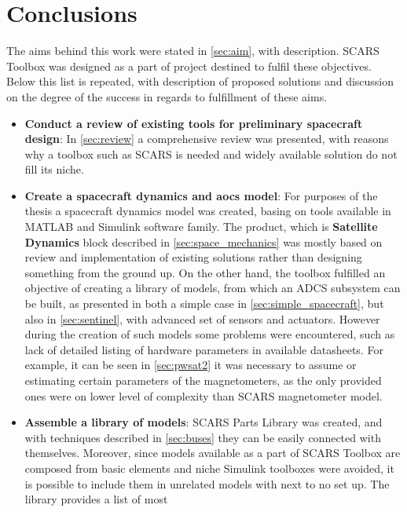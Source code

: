 \section{Conclusions}\label{sec:conclusions}

    The aims behind this work were stated in \autoref{sec:aim}, with description. SCARS Toolbox was designed as a part of project destined to fulfil these objectives. Below this list is repeated, with description of proposed solutions and discussion on the degree of the success in regards to fulfillment of these aims.
    
    \begin{itemize}
        \item \textbf{Conduct a review of existing tools for preliminary spacecraft design}: In \autoref{sec:review} a comprehensive review was presented, with reasons why a toolbox such as SCARS is needed and widely available solution do not fill its niche.
        \item \textbf{Create a spacecraft dynamics and \ac{aocs} model}: For purposes of the thesis a spacecraft dynamics model was created, basing on tools available in MATLAB  and Simulink software family. The product, which is \textbf{Satellite Dynamics} block described in \autoref{sec:space_mechanics} was mostly based on review and implementation of existing solutions rather than designing something from the ground up. On the other hand, the toolbox fulfilled an objective of creating a library of models, from which an ADCS subsystem can be built, as presented in both a simple case in \autoref{sec:simple_spacecraft}, but also in \autoref{sec:sentinel}, with advanced set of sensors and actuators. However during the creation of such models some problems were encountered, such as lack of detailed listing of hardware parameters in available datasheets. For example, it can be seen in \autoref{sec:pwsat2} it was necessary to assume or estimating certain parameters of the magnetometers, as the only provided ones were on lower level of complexity than SCARS magnetometer model.
        \item \textbf{Assemble a library of models}: SCARS Parts Library was created, and with techniques described in \autoref{sec:buses} they can be easily connected with themselves. Moreover, since models available as a part of SCARS Toolbox are composed from basic elements and niche Simulink toolboxes were avoided, it is possible to include them in unrelated models with next to no set up. The library provides a list of most

\end{itemize}
